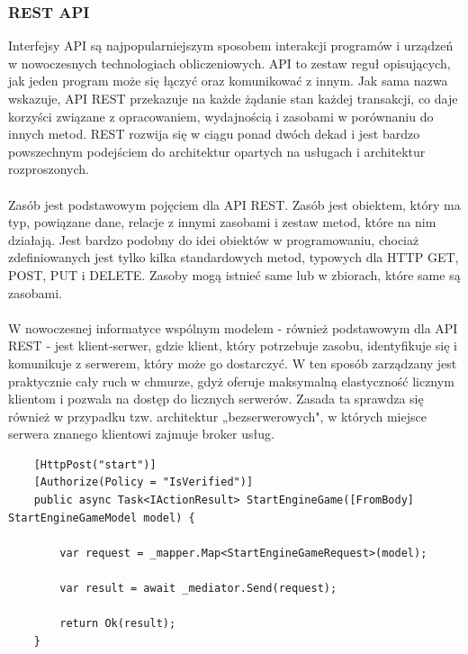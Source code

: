 \documentclass[12pt,a4paper]{article}
\begin{document}
\subsubsection{REST API}

Interfejsy API są najpopularniejszym sposobem interakcji programów i urządzeń w nowoczesnych technologiach obliczeniowych. API to zestaw reguł opisujących, jak jeden program może się łączyć oraz komunikować z innym. Jak sama nazwa wskazuje, API REST przekazuje na każde żądanie stan każdej transakcji, co daje korzyści związane z opracowaniem, wydajnością i zasobami w porównaniu do innych metod. REST rozwija się w ciągu ponad dwóch dekad i jest bardzo powszechnym podejściem do architektur opartych na usługach i architektur rozproszonych.
\\\\
Zasób jest podstawowym pojęciem dla API REST. Zasób jest obiektem, który ma typ, powiązane dane, relacje z innymi zasobami i zestaw metod, które na nim działają. Jest bardzo podobny do idei obiektów w programowaniu, chociaż zdefiniowanych jest tylko kilka standardowych metod, typowych dla HTTP GET, POST, PUT i DELETE. Zasoby mogą istnieć same lub w zbiorach, które same są zasobami.
\\\\
W nowoczesnej informatyce wspólnym modelem - również podstawowym dla API REST - jest klient-serwer, gdzie klient, który potrzebuje zasobu, identyfikuje się i komunikuje z serwerem, który może go dostarczyć. W ten sposób zarządzany jest praktycznie cały ruch w chmurze, gdyż oferuje maksymalną elastyczność licznym klientom i pozwala na dostęp do licznych serwerów. Zasada ta sprawdza się również w przypadku tzw. architektur „bezserwerowych", w których miejsce serwera znanego klientowi zajmuje broker usług.

\begin{verbatim}
    [HttpPost("start")]
    [Authorize(Policy = "IsVerified")]
    public async Task<IActionResult> StartEngineGame([FromBody] StartEngineGameModel model) {
    
        var request = _mapper.Map<StartEngineGameRequest>(model);
    
        var result = await _mediator.Send(request);
    
        return Ok(result);
    }
\end{verbatim}

\newpage
\end{document}

